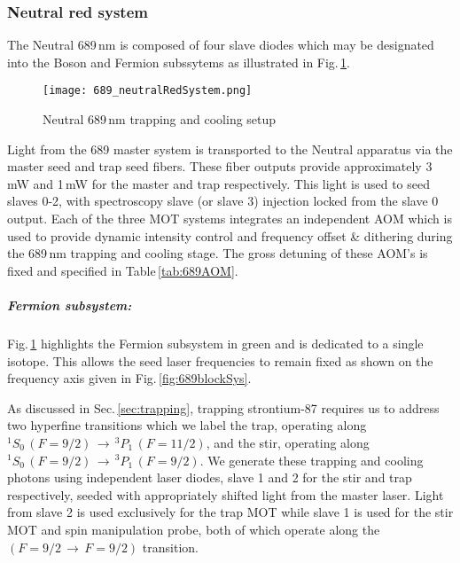%
%


\subsubsection{Neutral red system}
The Neutral 689\,nm is composed of four slave diodes which may be designated into the Boson and Fermion subssytems as illustrated in Fig.\,\ref{fig:neutralRed}.
	\begin{figure} 
		\centerline{
		\texttt{[image: 689\_neutralRedSystem.png]}}
		\caption{Neutral 689\,nm trapping and cooling setup}{}
		\label{fig:neutralRed}
	\end{figure}
Light from the 689 master system is transported to the Neutral apparatus via the master seed and trap seed fibers.
These fiber outputs provide approximately 3\,mW and 1\,mW for the master and trap respectively.
This light is used to seed slaves 0-2, with spectroscopy slave (or slave 3) injection locked from the slave 0 output.
Each of the three MOT systems integrates an independent AOM which is used to provide dynamic intensity control and frequency offset \& dithering during the 689\,nm trapping and cooling stage.
The gross detuning of these AOM's is fixed and specified in Table\,\ref{tab:689AOM}.

\subparagraph{Fermion subsystem:}
Fig.\,\ref{fig:neutralRed} highlights the Fermion subsystem in green and is dedicated to a single isotope.
This allows the seed laser frequencies to remain fixed as shown on the frequency axis given in Fig.\,\ref{fig:689blockSys}.

As discussed in Sec.\,\ref{sec:trapping}, trapping strontium-87 requires us to address two hyperfine transitions which we label the trap, operating along $^1S_0\,(F=9/2)\,\rightarrow\,^3P_1\,(F=11/2)$, and the stir, operating along $^1S_0\,(F=9/2)\,\rightarrow\,^3P_1\,(F=9/2)$.
We generate these trapping and cooling photons using independent laser diodes, slave 1 and 2 for the stir and trap respectively, seeded with appropriately shifted light from the master laser.
Light from slave 2 is used exclusively for the trap MOT while slave 1 is used for the stir MOT and spin manipulation probe, both of which operate along the $(F=9/2\,\rightarrow\,F=9/2)$ transition.

